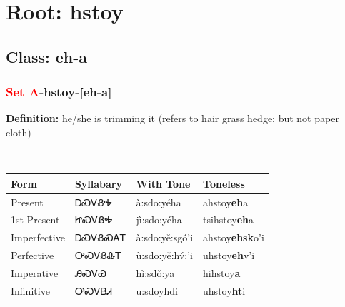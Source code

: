 \needspace{4in}
\section*{Root: hstoy}
\nopagebreak
{}
\needspace{3in}
\subsection*{Class: eh-a}
\nopagebreak
\needspace{2in}
\subsubsection*{\textcolor{Red}{Set A}{-}\textbf{hstoy}{-}[eh-a]}
\nopagebreak
\textbf{Definition: } he/she is trimming it (refers to hair{\quotesinglbase} grass{\quotesinglbase} hedge; but not paper{\quotesinglbase} cloth)
\\[0.5em]
\begin{tabularx}{\textwidth}{l X X X}%
\toprule%
\textbf{Form}&\textbf{Syllabary}&\textbf{With Tone}&\textbf{Toneless}\\%
\midrule%
Present&ᎠᏍᏙᏰᎭ&à:sdo:yéha&ahstoy\textbf{eh}a\\%
1st Present&ᏥᏍᏙᏰᎭ&jì:sdo:yéha&tsihstoy\textbf{eh}a\\%
Imperfective&ᎠᏍᏙᏰᏍᎪᎢ&à:sdo:yě:sgó’i&ahstoy\textbf{ehsk}o'i\\%
Perfective&ᎤᏍᏙᏰᎲᎢ&ù:sdo:yě:hv́:’i&uhstoy\textbf{eh}v'i\\%
Imperative&ᎯᏍᏙᏯ&hì:sdǒ:ya&hihstoy\textbf{a}\\%
Infinitive&ᎤᏍᏙᏴᏗ&u:sdoyhdi&uhstoy\textbf{ht}i\\%
\bottomrule%
\end{tabularx}
\\[1em]